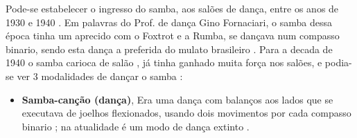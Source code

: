 Pode-se estabelecer o ingresso do samba, aos salões de dança, entre os anos de 1930 e 1940 \cite[pp. 140]{perna2002samba}.
Em palavras do Prof. de dança Gino Fornaciari, 
o samba dessa época tinha um aprecido com o Foxtrot e a Rumba, se dançava num compasso binario,
sendo esta dança a preferida do mulato brasileiro
\cite[pp. 50]{fornaciari1947aprender}.
Para a decada de 1940 o samba carioca de salão \cite[pp. 50]{fornaciari1947aprender},  já tinha ganhado muita força nos salões,
e podia-se ver 3 modalidades de dançar o samba \cite[pp. 58]{freitas1959danca} \cite[pp. 142-143]{perna2002samba} 
\cite[pp. 51]{fornaciari1947aprender}:
\begin{itemize}
\item \textbf{Samba-canção (dança)},
Era uma dança com balanços aos lados que se executava de joelhos flexionados,
usando dois movimentos por cada compasso binario \cite[pp. 58]{freitas1959danca} 
\cite[pp. 51]{fornaciari1947aprender} \cite[pp. 143]{perna2002samba}; 
na atualidade é um modo de dança extinto \cite[pp. 143]{perna2002samba}.


\end{itemize}
